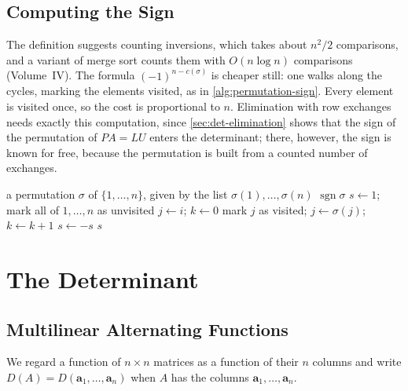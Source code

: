 \subsection{Computing the Sign}

The definition suggests counting inversions, which takes about $n^2/2$ comparisons, and a variant of merge sort counts them with $O(n\log n)$ comparisons (Volume~IV). The formula $(-1)^{n-c(\sigma)}$ is cheaper still: one walks along the cycles, marking the elements visited, as in \cref{alg:permutation-sign}. Every element is visited once, so the cost is proportional to $n$. Elimination with row exchanges needs exactly this computation, since \cref{sec:det-elimination} shows that the sign of the permutation of $PA=LU$ enters the determinant; there, however, the sign is known for free, because the permutation is built from a counted number of exchanges.

\begin{algorithm}
\begin{algorithmic}[1]
\Require a permutation $\sigma$ of $\{1,\ldots,n\}$, given by the list $\sigma(1),\ldots,\sigma(n)$
\Ensure $\operatorname{sgn}\sigma$
\State $s\gets1$; mark all of $1,\ldots,n$ as unvisited
   
    \State $j\gets i$; $k\gets0$
      \State mark $j$ as visited; $j\gets\sigma(j)$; $k\gets k+1$
    \EndWhile
     
      \State $s\gets-s$
    \EndIf
  \EndIf
\EndFor
\State \Return $s$
\end{algorithmic}
\caption{The sign of a permutation by its cycles (\cref{thm:sign-multiplicative}\,(ii) and (iii)). Each element is visited once, so the work is proportional to $n$, and $n$ marks are stored.}
\label{alg:permutation-sign}
\end{algorithm}

\section{The Determinant}
\label{sec:det-definition}

\subsection{Multilinear Alternating Functions}

We regard a function of $n\times n$ matrices as a function of their $n$ columns and write $D(A)=D(\mathbf a_1,\ldots,\mathbf a_n)$ when $A$ has the columns $\mathbf a_1,\ldots,\mathbf a_n$.

